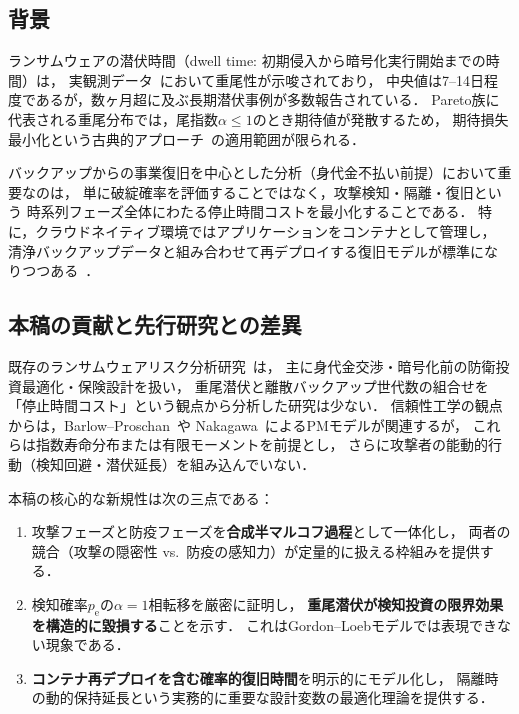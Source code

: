 \documentclass[12pt,a4paper]{article}
\theoremstyle{plain}
\theoremstyle{definition}
\theoremstyle{remark}
\newcommand{\pe}{p_{\mathrm{e}}}
\begin{document}
\subsection{背景}

ランサムウェアの潜伏時間（dwell time: 初期侵入から暗号化実行開始までの時間）は，
実観測データ~\cite{mandiant2023,ibm2023}において重尾性が示唆されており，
中央値は7--14日程度であるが，数ヶ月超に及ぶ長期潜伏事例が多数報告されている．
Pareto族に代表される重尾分布では，尾指数$\alpha\le1$のとき期待値が発散するため，
期待損失最小化という古典的アプローチ~\cite{gordon2002}の適用範囲が限られる．

バックアップからの事業復旧を中心とした分析（身代金不払い前提）において重要なのは，
単に破綻確率を評価することではなく，攻撃検知・隔離・復旧という
時系列フェーズ全体にわたる停止時間コストを最小化することである．
特に，クラウドネイティブ環境ではアプリケーションをコンテナとして管理し，
清浄バックアップデータと組み合わせて再デプロイする復旧モデルが標準になりつつある~\cite{nist2019}．

\subsection{本稿の貢献と先行研究との差異}

既存のランサムウェアリスク分析研究~\cite{laszka2017,dargahi2019,huang2018}は，
主に身代金交渉・暗号化前の防衛投資最適化・保険設計を扱い，
重尾潜伏と離散バックアップ世代数の組合せを
「停止時間コスト」という観点から分析した研究は少ない．
信頼性工学の観点からは，Barlow--Proschan~\cite{barlow1965}や
Nakagawa~\cite{nakagawa2005}によるPMモデルが関連するが，
これらは指数寿命分布または有限モーメントを前提とし，
さらに攻撃者の能動的行動（検知回避・潜伏延長）を組み込んでいない．

本稿の核心的な新規性は次の三点である：
\begin{enumerate}
\item 攻撃フェーズと防疫フェーズを\textbf{合成半マルコフ過程}として一体化し，
  両者の競合（攻撃の隠密性 vs.~防疫の感知力）が定量的に扱える枠組みを提供する．
\item 検知確率$\pe$の$\alpha=1$相転移を厳密に証明し，
  \textbf{重尾潜伏が検知投資の限界効果を構造的に毀損する}ことを示す．
  これはGordon--Loebモデルでは表現できない現象である．
\item \textbf{コンテナ再デプロイを含む確率的復旧時間}を明示的にモデル化し，
  隔離時の動的保持延長という実務的に重要な設計変数の最適化理論を提供する．
\end{enumerate}
\end{document}
